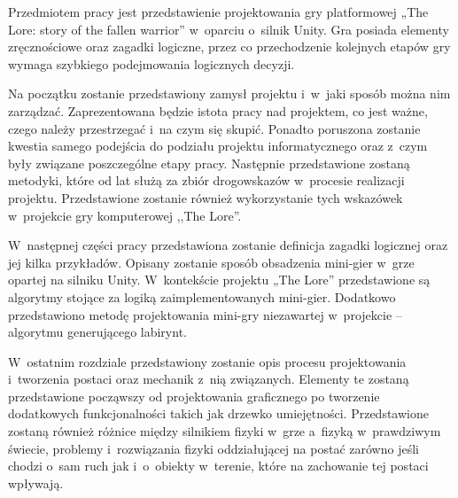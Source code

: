 \documentclass[oneside,polski,logo]{amuthesis}
\author{Kamil Tyrek, Mateusz Hypś, Jakub Kozubal}
\date{Poznań, luty 2021}
\begin{document}
\maketitle

\author{Kamil Tyrek}
\makestatement

\author{Mateusz Hypś}
\makestatement

\author{Jakub Kozubal}
\makestatement

\begin{streszczenie}
Przedmiotem pracy jest przedstawienie projektowania gry platformowej „The Lore: story of the fallen warrior” w~oparciu o~silnik Unity. Gra posiada elementy zręcznościowe oraz zagadki logiczne, przez co przechodzenie kolejnych etapów gry wymaga szybkiego podejmowania logicznych decyzji. \par
Na początku zostanie przedstawiony zamysł projektu i~w~jaki sposób można nim zarządzać. Zaprezentowana będzie istota pracy nad projektem, co jest ważne, czego należy przestrzegać i~na czym się skupić. Ponadto poruszona zostanie kwestia samego podejścia do podziału projektu informatycznego oraz z~czym były związane poszczególne etapy pracy. Następnie przedstawione zostaną metodyki, które od lat służą za zbiór drogowskazów w~procesie realizacji projektu. Przedstawione zostanie również wykorzystanie tych wskazówek w~projekcie gry komputerowej ,,The Lore''. \par
W~następnej części pracy przedstawiona zostanie definicja zagadki logicznej oraz jej kilka przykładów. Opisany zostanie sposób obsadzenia mini-gier w~grze opartej na silniku Unity. W~kontekście projektu „The Lore” przedstawione są algorytmy stojące za logiką zaimplementowanych mini-gier. Dodatkowo przedstawiono metodę projektowania mini-gry niezawartej w~projekcie – algorytmu generującego labirynt. \par
W~ostatnim rozdziale przedstawiony zostanie opis procesu projektowania i~tworzenia postaci oraz mechanik z~nią związanych. Elementy te zostaną przedstawione począwszy od projektowania graficznego po tworzenie dodatkowych funkcjonalności takich jak drzewko umiejętności. Przedstawione zostaną również różnice między silnikiem fizyki w~grze a~fizyką w~prawdziwym świecie, problemy i~rozwiązania fizyki oddziałującej na postać zarówno jeśli chodzi o~sam ruch jak i~o~obiekty w~terenie, które na zachowanie tej postaci wpływają.
\end{streszczenie}
\end{document}
